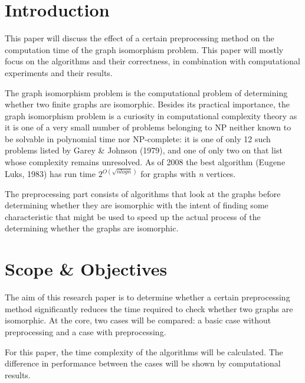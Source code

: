\documentclass[twoside]{article}
\theoremstyle{definition}
\theoremstyle{plain}
\begin{document}
\begin{multicols}{2} %

\section{Introduction} 

This paper will discuss the effect of a certain preprocessing method on the computation time of the graph isomorphism problem. This paper will mostly focus on the algorithms and their correctness, in combination with computational experiments and their results.

The graph isomorphism problem is the computational problem of determining whether two finite graphs are isomorphic. Besides its practical importance, the graph isomorphism problem is a curiosity in computational complexity theory as it is one of a very small number of problems belonging to NP neither known to be solvable in polynomial time nor NP-complete: it is one of only 12 such problems listed by Garey \& Johnson (1979)\cite{book:garyJohnson1979}, and one of only two on that list whose complexity remains unresolved. As of 2008 the best algorithm (Eugene Luks, 1983) has run time $2^{O(\sqrt{n log n})}$ for graphs with \emph{n} vertices.\cite{article:davidJohnson2005}\cite{inproceedings:babaiCodenotti2008}\cite{website:wikiGI}

The preprocessing part consists of algorithms that look at the graphs before determining whether they are isomorphic with the intent of finding some characteristic that might be used to speed up the actual process of the determining whether the graphs are isomorphic.


\section{Scope \& Objectives}

The aim of this research paper is to determine whether a certain preprocessing method significantly reduces the time required to check whether two graphs are isomorphic. At the core, two cases will be compared: a basic case without preprocessing and a case with preprocessing. 

For this paper, the time complexity of the algorithms will be calculated. The difference in performance between the cases will be shown by computational results.


\end{multicols}
\end{document}
